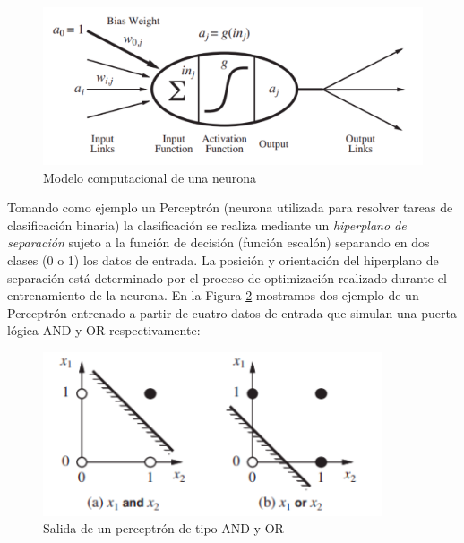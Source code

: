 \begin{figure}[H]
  \begin{center}
    \includegraphics[width=15cm]{imagenes/cap1/neurona.png}
  \end{center}
  \caption[Modelo computacional de una neurona]{Modelo computacional de una neurona \cite{AIMA}}
  \label{fig:neurona}
\end{figure}

Tomando como ejemplo un Perceptrón (neurona utilizada para resolver tareas de clasificación binaria) la clasificación se realiza mediante un \textit{hiperplano de separación} sujeto a la función de decisión (función escalón) separando en dos clases (0 o 1) los datos de entrada. La posición y orientación del hiperplano de separación está determinado por el proceso de optimización realizado durante el entrenamiento de la neurona. En la Figura \ref{fig:salida_perceptron} mostramos dos ejemplo de un Perceptrón entrenado a partir de cuatro datos de entrada que simulan una puerta lógica AND y OR respectivamente:\\

\begin{figure}[H]
  \begin{center}
    \includegraphics[width=10cm]{imagenes/cap1/ejemplo-perceptron.png}
  \end{center}
  \caption[Salida de un perceptrón de tipo AND y OR]{Salida de un perceptrón de tipo AND y OR \cite{AIMA}}
  \label{fig:salida_perceptron}
\end{figure}\

